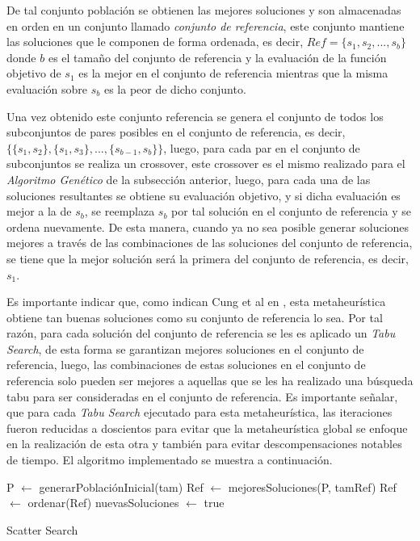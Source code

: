 \documentclass{ci5652}
\begin{document}
De tal conjunto población se obtienen las mejores soluciones y son almacenadas en orden en un conjunto llamado \textit{conjunto de referencia}, este conjunto mantiene las soluciones que le componen de forma ordenada, es decir, \(Ref = \{s_{1}, s_{2}, ..., s_{b}\}\) donde \(b\) es el tamaño del conjunto de referencia y la evaluación de la función objetivo de \(s_{1}\) es la mejor en el conjunto de referencia mientras que la misma evaluación sobre \(s_{b}\) es la peor de dicho conjunto. 

Una vez obtenido este conjunto referencia se genera el conjunto de todos los subconjuntos de pares posibles en el conjunto de referencia, es decir, \(\{\{s_{1}, s_{2}\}, \{s_{1}, s_{3}\},..., \{s_{b-1}, s_{b}\}\}\), luego, para cada par en el conjunto de subconjuntos se realiza un crossover, este crossover es el mismo realizado para el \textit{Algoritmo Genético} de la subsección anterior, luego, para cada una de las soluciones resultantes se obtiene su evaluación objetivo, y si dicha evaluación es mejor a la de \(s_{b}\), se reemplaza \(s_{b}\) por tal solución en el conjunto de referencia y se ordena nuevamente. De esta manera, cuando ya no sea posible generar soluciones mejores a través de las combinaciones de las soluciones del conjunto de referencia, se tiene que la mejor solución será la primera del conjunto de referencia, es decir, \(s_{1}\).


Es importante indicar que, como indican Cung et al en \cite{cung1996}, esta metaheurística obtiene tan buenas soluciones como su conjunto de referencia lo sea. Por tal razón, para cada solución del conjunto de referencia se les es aplicado un \textit{Tabu Search}, de esta forma se garantizan mejores soluciones en el conjunto de referencia, luego, las combinaciones de estas soluciones en el conjunto de referencia solo pueden ser mejores a aquellas que se les ha realizado una búsqueda tabu para ser consideradas en el conjunto de referencia. Es importante señalar, que para cada \textit{Tabu Search} ejecutado para esta metaheurística, las iteraciones fueron reducidas a doscientos para evitar que la metaheurística global se enfoque en la realización de esta otra y también para evitar descompensaciones notables de tiempo. El algoritmo implementado se muestra a continuación.



\begin{algorithm}
 \DontPrintSemicolon
 \vspace*{0.1cm}
 P $\leftarrow$ generarPoblaciónInicial(tam)\;
 Ref $\leftarrow$ mejoresSoluciones(P, tamRef)\;
 Ref $\leftarrow$ ordenar(Ref)\;
 nuevasSoluciones $\leftarrow$ true\; 
 
 \vspace*{0.1cm}
 \caption{Scatter Search}
\end{algorithm}
\end{document}

